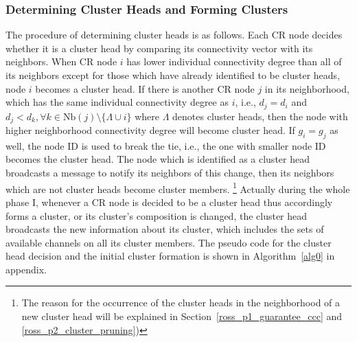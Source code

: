 \documentclass[times]{ettauth}
\newcommand{\ie}{i.e., }
\theoremstyle{mytheoremstyle}
\theoremstyle{mytheoremstyle}
\theoremstyle{mytheoremstyle}
\begin{document}
	


\subsubsection{Determining Cluster Heads and Forming Clusters}
The procedure of determining cluster heads is as follows.
Each CR node decides whether it is a cluster head by comparing its connectivity vector with its neighbors.
When CR node $i$ has lower individual connectivity degree than all of its neighbors except for those which have already identified to be cluster heads, node $i$ becomes a cluster head.
If there is another CR node $j$ in its neighborhood, which has the same individual connectivity degree as $i$, \ie $d_j = d_i$ and $d_j < d_{k}, \forall k\in \text{Nb}(j)\setminus \{\Lambda\cup i\}$ where $\Lambda$ denotes cluster heads, then the node with higher neighborhood connectivity degree will become cluster head.
If $g_i = g_j$ as well, the node ID is used to break the tie, \ie the one with smaller node ID becomes the cluster head.
%
The node which is identified as a cluster head broadcasts a message to notify its neighbors of this change, then its neighbors which are not cluster heads become cluster members.
\footnote{The reason for the occurrence of the cluster heads in the neighborhood of a new cluster head will be explained in Section~\ref{ross_p1_guarantee_ccc} and \ref{ross_p2_cluster_pruning})}
Actually during the whole phase I, whenever a CR node is decided to be a cluster head thus accordingly forms a cluster, or its cluster's composition is changed, the cluster head broadcasts the new information about its cluster, which includes the sets of available channels on all its cluster members.
The pseudo code for the cluster head decision and the initial cluster formation is shown in Algorithm~\ref{alg0} in appendix.
\end{document}
